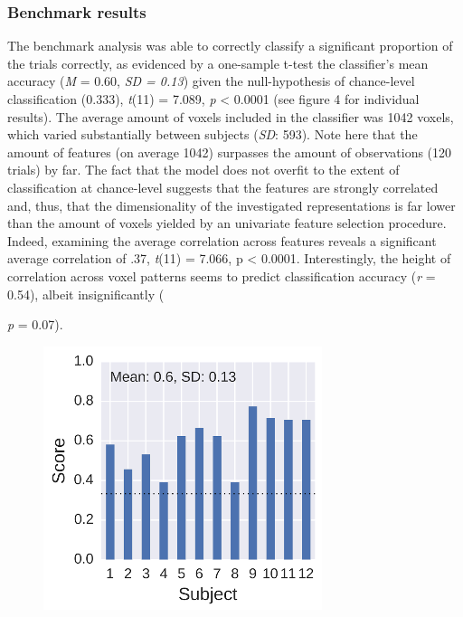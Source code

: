 \documentclass[jou,12pt,a4paper]{apa6}
\begin{document}
\subsubsection{Benchmark results}
\noindent The benchmark analysis was able to correctly classify a significant proportion of the trials correctly, as evidenced by a one-sample t-test the classifier's mean accuracy (\emph{M} = 0.60, \emph{SD = 0.13}) given the null-hypothesis of chance-level classification (0.333), \emph{t}(11) = 7.089, \emph{p} < 0.0001 (see figure 4 for individual results). The average amount of voxels included in the classifier was 1042 voxels, which varied substantially between subjects (\emph{SD}: 593). Note here that the amount of features (on average 1042) surpasses the amount of observations (120 trials) by far. The fact that the model does not overfit to the extent of classification at chance-level suggests that the features are strongly correlated and, thus, that the dimensionality of the investigated representations is far lower than the amount of voxels yielded by an univariate feature selection procedure. Indeed, examining the average correlation across features reveals a significant average correlation of .37, \emph{t}(11) = 7.066, p < 0.0001. Interestingly, the height of correlation across voxel patterns seems to predict classification accuracy (\emph{r} = 0.54), albeit insignificantly ({\emph{p} = 0.07).     

\begin{figure}[ht]
\centering
\includegraphics[width=\textwidth]{benchmark_plot}
\end{figure}

}
\end{document}
